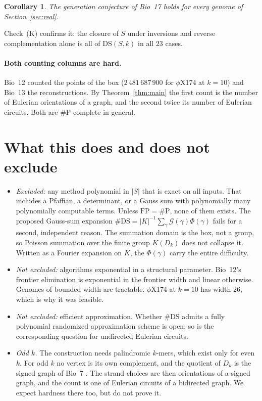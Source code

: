 \documentclass[11pt]{article}
\theoremstyle{plain}
\newtheorem{corollary}[theorem]{Corollary}
\theoremstyle{definition}
\theoremstyle{remark}
\newcommand{\DS}{\mathrm{DS}}
\newcommand{\sP}{\#\mathrm{P}}
\begin{document}
\begin{corollary}
The generation conjecture of Bio~17 holds for every genome of Section~\ref{sec:real}.
\end{corollary}

Check~(K) confirms it: the closure of $S$ under inversions and reverse complementation alone is all of
$\DS(S,k)$ in all $23$ cases.

\paragraph{Both counting columns are hard.} Bio~12 counted the points of the box ($2\,481\,687\,900$ for
$\phi$X174 at $k=10$) and Bio~13 the reconstructions. By Theorem~\ref{thm:main} the first count is the
number of Eulerian orientations of a graph, and the second twice its number of Eulerian circuits. Both are
$\sP$-complete in general.

\section{What this does and does not exclude}\label{sec:scope}

\begin{itemize}
\item \emph{Excluded:} any method polynomial in $|S|$ that is exact on all inputs. That includes a
Pfaffian, a determinant, or a Gauss sum with polynomially many polynomially computable terms. Unless
$\mathrm{FP}=\sP$, none of them exists. The proposed Gauss-sum expansion
$\#\DS=|K|^{-1}\sum_\gamma\mathcal G(\gamma)\Phi(\gamma)$ fails for a second, independent reason. The
summation domain is the box, not a group, so Poisson summation over the finite group $K(D_k)$ does not
collapse it. Written as a Fourier expansion on $K$, the $\Phi(\gamma)$ carry the entire difficulty.
\item \emph{Not excluded:} algorithms exponential in a structural parameter. Bio~12's frontier
elimination is exponential in the frontier width and linear otherwise. Genomes of bounded width are
tractable. $\phi$X174 at $k=10$ has width $26$, which is why it was feasible.
\item \emph{Not excluded:} efficient approximation. Whether $\#\DS$ admits a fully polynomial randomized
approximation scheme is open; so is the corresponding question for undirected Eulerian circuits.
\item \emph{Odd $k$.} The construction needs palindromic $k$-mers, which exist only for even $k$. For odd
$k$ no vertex is its own complement, and the quotient of $D_k$ is the signed graph of Bio~7 \cite{Bio7}.
The strand choices are then orientations of a signed graph, and the count is one of Eulerian circuits of a
bidirected graph. We expect hardness there too, but do not prove it.
\end{itemize}
\end{document}
